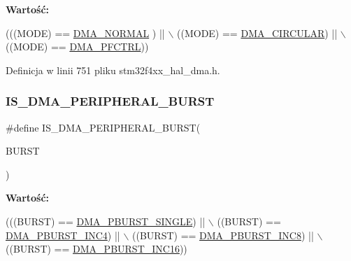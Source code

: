 {\bfseries Wartość\+:}
\begin{DoxyCode}
(((MODE) == \hyperlink{group___d_m_a__mode_ga04941acfbbdefc53e1e08133cffa3b8a}{DMA\_NORMAL} )  || \(\backslash\)
                           ((MODE) == \hyperlink{group___d_m_a__mode_ga4c4f425cba13edffb3c831c036c91e01}{DMA\_CIRCULAR}) || \(\backslash\)
                           ((MODE) == \hyperlink{group___d_m_a__mode_ga7974ee645c8e275a2297cf37eec9e022}{DMA\_PFCTRL}))
\end{DoxyCode}


Definicja w linii 751 pliku stm32f4xx\+\_\+hal\+\_\+dma.\+h.

\mbox{\label{group___d_m_a___private___macros_ga7c60961178e2a32e9e364a220a8aca88}} 
\subsubsection{\texorpdfstring{I\+S\+\_\+\+D\+M\+A\+\_\+\+P\+E\+R\+I\+P\+H\+E\+R\+A\+L\+\_\+\+B\+U\+R\+ST}{IS\_DMA\_PERIPHERAL\_BURST}}
{\footnotesize\ttfamily \#define I\+S\+\_\+\+D\+M\+A\+\_\+\+P\+E\+R\+I\+P\+H\+E\+R\+A\+L\+\_\+\+B\+U\+R\+ST(\begin{DoxyParamCaption}\item[{}]{B\+U\+R\+ST }\end{DoxyParamCaption})}

{\bfseries Wartość\+:}
\begin{DoxyCode}
(((BURST) == \hyperlink{group___d_m_a___peripheral__burst_ga1ee9cf4dc1c8bfc5ab6dfb95a00f81ff}{DMA\_PBURST\_SINGLE}) || \(\backslash\)
                                        ((BURST) == \hyperlink{group___d_m_a___peripheral__burst_gacc54efc746528ed9e0173dad956f7caf}{DMA\_PBURST\_INC4})   || \(\backslash\)
                                        ((BURST) == \hyperlink{group___d_m_a___peripheral__burst_gaf76dd9b208c8606e8c5ae7abf8c26532}{DMA\_PBURST\_INC8})   || \(\backslash\)
                                        ((BURST) == \hyperlink{group___d_m_a___peripheral__burst_ga705a631ea96b34aa5afa7fed06a487e0}{DMA\_PBURST\_INC16}))
\end{DoxyCode}



